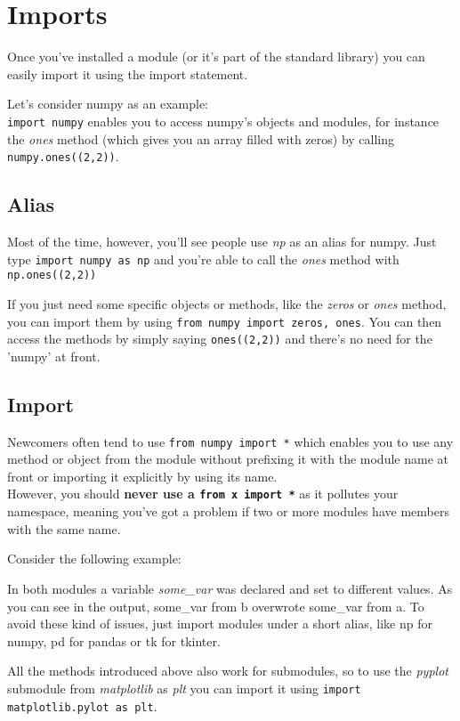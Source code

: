 \section{Imports}

  Once you've installed a module (or it's part of the standard library) you can
  easily import it using the import statement.

  Let's consider numpy as an example:\\
  \texttt{import numpy} enables you to access numpy's objects and modules, 
  for instance the \textit{ones} method (which gives you an array filled with zeros)
  by calling \texttt{numpy.ones((2,2))}.

  \subsection{Alias}

    Most of the time, however, you'll see people use \textit{np} as an alias for numpy.
    Just type \texttt{import numpy as np} and you're able to call the
    \textit{ones} method with \texttt{np.ones((2,2))}

    If you just need some specific objects or methods, like the \textit{zeros} or \textit{ones} method,
    you can import them by using \texttt{from numpy import zeros, ones}.
    You can then access the methods by simply saying
    \texttt{ones((2,2))} and there's no need for the 'numpy' at front.

  \subsection{Import \textasteriskcentered}

    Newcomers often tend to use \texttt{from numpy import *} which
    enables you to use any method or object from the module without prefixing
    it with the module name at front or importing it explicitly by using its name.\\
    However, you should \textbf{never use a \texttt{from x import *}}
    as it pollutes your namespace, meaning you've got a problem if
    two or more modules have members with the same name.

    Consider the following example:

    In both modules a variable \textit{some\_var} was declared and set to different values.
    As you can see in the output, some\_var from b overwrote some\_var from a.
    To avoid these kind of issues, just import modules under a short alias, like
    np for numpy, pd for pandas or tk for tkinter.

    All the methods introduced above also work for submodules, so to use the \textit{pyplot} submodule
    from \textit{matplotlib} as \textit{plt} you can import it using
    \texttt{import matplotlib.pylot as plt}.